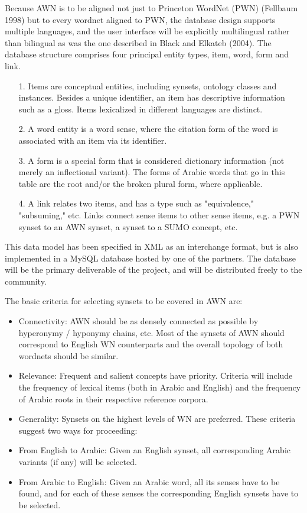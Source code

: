 Because AWN is to be aligned not just to Princeton WordNet (PWN) (Fellbaum 1998) but to every wordnet aligned to PWN, the database design supports multiple languages, and the user interface will be explicitly multilingual rather than bilingual as was the one described in Black and Elkateb (2004).
The database structure comprises four principal entity types, item, word, form and link.
\begin{itemize}
\item [1.] Items are conceptual entities, including synsets, ontology classes and instances. Besides a unique identifier, an item has descriptive information such as a gloss. Items lexicalized in different languages are distinct.
\item [2.]A word entity is a word sense, where the citation form of the word is associated with an item via its identifier.
\item [3.]A form is a special form that is considered dictionary information (not merely an inflectional variant). The forms of Arabic words that go in this table are the root and/or the broken plural form, where applicable.
\item [4.]A link relates two items, and has a type such as "equivalence," "subsuming," etc. Links connect sense items to other sense items, e.g. a PWN synset to an AWN synset, a synset to a SUMO concept, etc.
\end{itemize}
This data model has been specified in XML as an interchange format, but is also implemented in a MySQL database hosted by one of the partners. The database will be the primary deliverable of the project, and will be distributed freely to the community.

The basic criteria for selecting synsets to be covered in AWN are: 
\begin{itemize}
\item Connectivity: AWN should be as densely connected as possible by hyperonymy / hyponymy chains, etc. Most of the synsets of AWN should correspond to English WN counterparts and the overall topology of both wordnets should be similar.
\item Relevance: Frequent and salient concepts have priority. Criteria will include the frequency of lexical items (both in Arabic and English) and the frequency of Arabic roots in their respective reference corpora.
\item Generality: Synsets on the highest levels of WN are preferred. These criteria suggest two ways for proceeding:
\item From English to Arabic: Given an English synset, all corresponding Arabic variants (if any) will be selected.
\item From Arabic to English: Given an Arabic word, all its senses have to be found, and for each of these senses the corresponding English synsets have to be selected.
\end{itemize}

